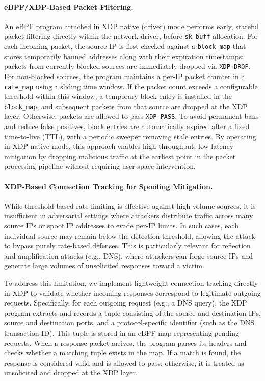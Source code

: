 \documentclass[twocolumn, 10pt]{scrartcl}
\begin{document}
\paragraph{eBPF/XDP-Based Packet Filtering.}
An eBPF program attached in XDP native (driver) mode performs early, stateful packet filtering directly within the network driver, before \texttt{sk\_buff} allocation. For each incoming packet, the source IP is first checked against a \texttt{block\_map} that stores temporarily banned addresses along with their expiration timestamps; packets from currently blocked sources are immediately dropped via \texttt{XDP\_DROP}. For non-blocked sources, the program maintains a per-IP packet counter in a \texttt{rate\_map} using a sliding time window. If the packet count exceeds a configurable threshold within this window, a temporary block entry is installed in the \texttt{block\_map}, and subsequent packets from that source are dropped at the XDP layer. Otherwise, packets are allowed to pass \texttt{XDP\_PASS}. To avoid permanent bans and reduce false positives, block entries are automatically expired after a fixed time-to-live (TTL), with a periodic sweeper removing stale entries. By operating in XDP native mode, this approach enables high-throughput, low-latency mitigation by dropping malicious traffic at the earliest point in the packet processing pipeline without requiring user-space intervention.

\paragraph{XDP-Based Connection Tracking for Spoofing Mitigation.}
While threshold-based rate limiting is effective against high-volume sources, it is insufficient in adversarial settings where attackers distribute traffic across many source IPs or spoof IP addresses to evade per-IP limits. In such cases, each individual source may remain below the detection threshold, allowing the attack to bypass purely rate-based defenses. This is particularly relevant for reflection and amplification attacks (e.g., DNS), where attackers can forge source IPs and generate large volumes of unsolicited responses toward a victim.

To address this limitation, we implement lightweight connection tracking directly in XDP to validate whether incoming responses correspond to legitimate outgoing requests. Specifically, for each outgoing request (e.g., a DNS query), the XDP program extracts and records a tuple consisting of the source and destination IPs, source and destination ports, and a protocol-specific identifier (such as the DNS transaction ID). This tuple is stored in an eBPF map representing pending requests. When a response packet arrives, the program parses its headers and checks whether a matching tuple exists in the map. If a match is found, the response is considered valid and is allowed to pass; otherwise, it is treated as unsolicited and dropped at the XDP layer.
\end{document}
